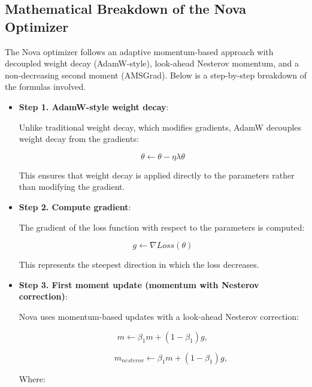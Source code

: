 \documentclass{article}
\begin{document}
\subsection{Mathematical Breakdown of the Nova Optimizer}


The Nova optimizer follows an adaptive momentum-based approach with decoupled weight decay (AdamW-style), look-ahead Nesterov momentum, and a non-decreasing second moment (AMSGrad). Below is a step-by-step breakdown of the formulas involved.


\begin{itemize}



\item {\bf Step 1. AdamW-style weight decay}:


Unlike traditional weight decay, which modifies gradients, AdamW decouples weight decay from the gradients:


\begin{equation}
\theta \leftarrow \theta - \eta\lambda\theta
\end{equation}


This ensures that weight decay is applied directly to the parameters rather than modifying the gradient.

\item {\bf Step 2. Compute gradient}:

The gradient of the loss function with respect to the parameters is computed:



\begin{equation}
g \leftarrow \nabla Loss(\theta)
\end{equation}


This represents the steepest direction in which the loss decreases.

\item {\bf Step 3. First moment update (momentum with Nesterov correction)}:

Nova uses momentum-based updates with a look-ahead Nesterov correction:

\begin{equation}
m \leftarrow \beta_1m+(1-\beta_1)g, 
\end{equation}

\begin{equation}
~~~~~~~~~m_{nesterov} \leftarrow \beta_1m+(1-\beta_1)g, 
\end{equation}

Where:




\end{itemize}
\end{document}
